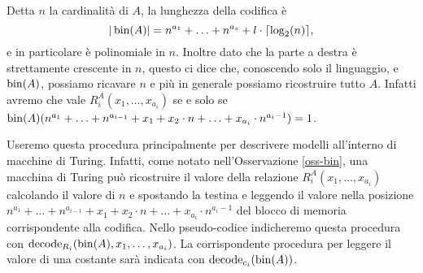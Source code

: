 \begin{osservazione}
\label{oss-bin}
 Detta $n$ la cardinalità di $A$, la lunghezza della codifica è
 \[ |\operatorname{bin}(A)|=n^{a_1} + \ldots + n^{a_s} + l \cdot \lceil \log_2(n) \rceil, \]
 e in particolare è polinomiale in $n$. Inoltre dato che la parte a destra è
 strettamente crescente in $n$, questo ci dice che, conoscendo solo il linguaggio,
 e $\operatorname{bin}(A)$, possiamo ricavare $n$ e più in generale possiamo ricostruire tutto $A$.
 Infatti avremo che vale $R_i^A(x_1,\ldots, x_{a_i})$ se e solo se
 $\operatorname{bin}(A)(n^{a_1} + \ldots + n^{a_{i-1}} + x_1 + x_2 \cdot n + \ldots + x_{a_i} \cdot n^{a_i-1}) = 1$.
\end{osservazione}
Useremo questa procedura principalmente per descrivere modelli all'interno
di macchine di Turing. Infatti, come notato nell'Osservazione \ref{oss-bin},
una macchina di Turing può ricostruire
il valore della relazione $R_i^A(x_1, \ldots, x_{a_i})$ calcolando il valore
di $n$ e spostando la testina e leggendo il valore nella posizione
$n^{a_1} + \ldots + n^{a_{i-1}} + x_1 + x_2 \cdot n + \ldots + x_{a_i} \cdot n^{a_i-1}$
del blocco di memoria corrispondente alla codifica.
Nello pseudo-codice indicheremo questa procedura con
$\operatorname{decode}_{R_i}(\operatorname{bin}(A), x_1, \ldots, x_{a_i})$. La corrispondente procedura per
leggere il valore di una costante sarà indicata con $\operatorname{decode}_{c_i} (\operatorname{bin}(A))$.

